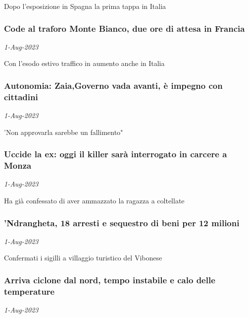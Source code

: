 Dopo l'esposizione in Spagna la prima tappa in Italia
\subsubsection{Code al traforo Monte Bianco, due ore di attesa in Francia \href{https://www.ansa.it/sito/notizie/cronaca/2023/08/01/code-al-traforo-monte-bianco-due-ore-di-attesa-in-francia_5df50cc1-5779-4ecc-9190-a075d5838bf8.html}{}}
\textit{1-Aug-2023}

Con l'esodo estivo traffico in aumento anche in Italia
\subsubsection{Autonomia: Zaia,Governo vada avanti, \`{e} impegno con cittadini \href{https://www.ansa.it/sito/notizie/cronaca/2023/08/01/autonomia-zaiagoverno-vada-avanti-e-impegno-con-cittadini_abf30d96-7184-407a-8457-39a6eb42981d.html}{}}
\textit{1-Aug-2023}

'Non approvarla sarebbe un fallimento"
\subsubsection{Uccide la ex: oggi il killer sar\`{a} interrogato in carcere a Monza \href{https://www.ansa.it/sito/notizie/cronaca/2023/08/01/uccide-la-ex-oggi-il-killer-sara-interrogato-in-carcere-a-monza_a345ca50-15ab-4729-b5f1-0846a782a8d7.html}{}}
\textit{1-Aug-2023}

Ha gi\`{a} confessato di aver ammazzato la ragazza a coltellate
\subsubsection{'Ndrangheta, 18 arresti e sequestro di beni per 12 milioni \href{https://www.ansa.it/sito/notizie/cronaca/2023/08/01/ndrangheta-18-arresti-e-sequestro-di-beni-per-12-milioni_37a0971a-8e53-4dc0-af24-0aa26f50e807.html}{}}
\textit{1-Aug-2023}

Confermati i sigilli a villaggio turistico del Vibonese
\subsubsection{Arriva ciclone dal nord, tempo instabile e calo delle temperature \href{https://www.ansa.it/sito/notizie/cronaca/2023/08/01/arriva-ciclone-dal-nordtempo-instabile-e-calo-delle-temperature_40006c01-dd80-4dee-bf43-f0dbc98a8aec.html}{}}
\textit{1-Aug-2023}

